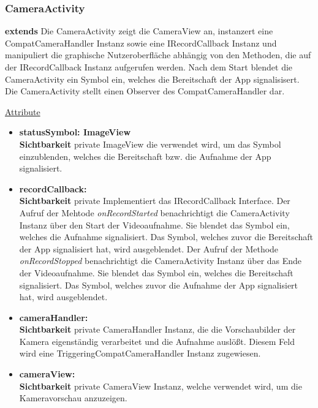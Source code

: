 \subsubsection{CameraActivity} \label{app:klasse:CameraActivity}
\textbf{extends}  \newline
Die CameraActivity zeigt die CameraView an, instanzert eine CompatCameraHandler Instanz sowie eine IRecordCallback Instanz und manipuliert die graphische Nutzeroberfläche abhängig von den Methoden, die auf der IRecordCallback Instanz aufgerufen werden. Nach dem Start blendet die CameraActivity ein Symbol ein, welches die Bereitschaft der App signalisisert. Die CameraActivity stellt einen Observer des CompatCameraHandler dar.
\newline

\underline{Attribute}
\begin{itemize}
\itemsep0pt

\item \textbf{statusSymbol: ImageView} \hfill\\ 
\textbf{Sichtbarkeit} private\newline
ImageView die verwendet wird, um das Symbol einzublenden, welches die Bereitschaft bzw. die Aufnahme der App signalisiert.

\item \textbf{recordCallback: } \hfill\\ 
\textbf{Sichtbarkeit} private\newline
Implementiert das IRecordCallback Interface. 
Der Aufruf der Mehtode \textit{onRecordStarted} benachrichtigt die CameraActivity Instanz über den Start der Videoaufnahme. Sie blendet das Symbol ein, welches die Aufnahme signalisiert. Das Symbol, welches zuvor die Bereitschaft der App signalisiert hat, wird ausgeblendet.
Der Aufruf der Methode \textit{onRecordStopped} benachrichtigt die CameraActivity Instanz über das Ende der Videoaufnahme. Sie blendet das Symbol ein, welches die Bereitschaft signalisiert. Das Symbol, welches zuvor die Aufnahme der App signalisiert hat, wird ausgeblendet.

\item \textbf{cameraHandler: } \hfill\\ 
\textbf{Sichtbarkeit} private\newline
CameraHandler Instanz, die die Vorschaubilder der Kamera eigenständig verarbeitet und die Aufnahme auslößt. Diesem Feld wird eine TriggeringCompatCameraHandler Instanz zugewiesen.

\item \textbf{cameraView: } \hfill\\ 
\textbf{Sichtbarkeit} private\newline
CameraView Instanz, welche verwendet wird, um die Kameravorschau anzuzeigen.

\end{itemize}

